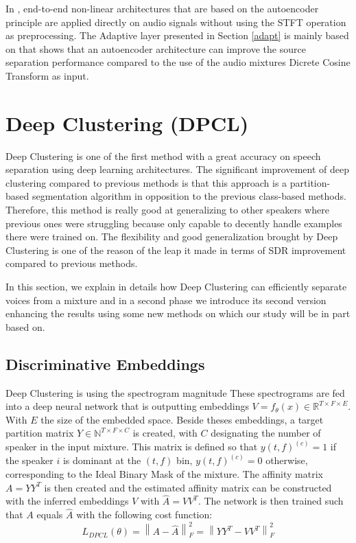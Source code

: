 \documentclass[master, tikz, final,11pt, dvipdfmx]{iscs-thesis}
\newcommand{\norm}[1]{\left\lVert#1\right\rVert}
\begin{document}
In \cite{TAS, Adaptive}, end-to-end non-linear architectures that are based on the autoencoder principle are applied directly on audio signals without using the STFT operation as preprocessing. 
The Adaptive layer presented in Section \ref{adapt} is mainly based on \cite{Adaptive} that shows that an autoencoder architecture can improve the source separation performance compared to the use of the audio mixtures Dicrete Cosine Transform as input.

\section{Deep Clustering (DPCL)}

Deep Clustering \cite{DPCLV1,DPCLV2, DPCLEXT, chimera} is one of the first method with a great accuracy on speech separation using deep learning architectures. The significant improvement of deep clustering compared to previous methods is that this approach is a partition-based segmentation algorithm in opposition to the previous class-based methods. Therefore, this method is really good at generalizing to other speakers where previous ones were struggling because only capable to decently handle examples there were trained on. The flexibility and good generalization brought by Deep Clustering is one of the reason of the leap it made in terms of SDR improvement compared to previous methods.

In this section, we explain in details how Deep Clustering can efficiently separate voices from a mixture and in a second phase we introduce its second version enhancing the results using some new methods on which our study will be in part based on.

\subsection{Discriminative Embeddings}
\label{DE}
Deep Clustering is using the spectrogram magnitude
These spectrograms are fed into a deep neural network that is outputting embeddings $V = f_\theta(x) \in \mathbb{R}^{T \times F \times E}$. With $E$ the size of the embedded space.
Beside theses embeddings, a target partition matrix $Y \in \mathbb{N}^{T \times F \times C}$ is created,  with $C$ designating the number of speaker in the input mixture. This matrix is defined so that $y(t,f)^{(c)} = 1$ if the speaker $i$ is dominant at the $(t,f)$ bin, $y(t,f)^{(c)} = 0$ otherwise, corresponding to the Ideal Binary Mask of the mixture. The affinity matrix $A = YY^{T}$ is then created and the estimated affinity matrix can be constructed with the inferred embeddings $V$ with $\hat{A}=VV^{T}$. The network is then trained such that $A$ equals $\hat{A}$ with the following cost function:
\[L_{DPCL}(\theta) = \norm{ A - \hat{A}}^2_F =  \norm{ YY^{T} - VV^{T}}^2_F \]
 
\end{document}
